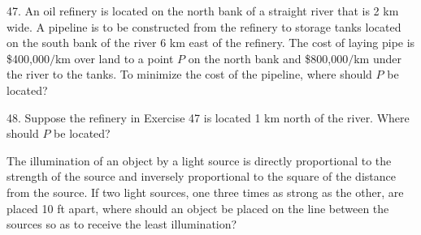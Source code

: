 \documentclass{sebase}
\begin{document}
\begin{multicols}{2}
\begin{ExerciseList}
%

\item[\hfill 47.] An oil refinery is located on the north bank of a straight
river that is 2 km wide. A pipeline is to be constructed from the refinery
to storage tanks located on the south bank of the river 6 km east of the
refinery. The cost of laying pipe is \$400,000$/$km over land to a point $P$
on the north bank and \$800,000$/$km under the river to the tanks. To
minimize the cost of the pipeline, where should $P$ be located?

%

%

\item[\hfill 48.] 
\GCALCX%
Suppose the refinery in Exercise 47 is located 1 km north of the river.
Where should $P$ be located?

%

\item[{\hfill {\protect\fbox{\hspace{-2pt}49.\hspace{-2pt}}}}] The
illumination of an object by a light source is directly proportional to the
strength of the source and inversely proportional to the square of the
distance from the source. If two light sources, one three times as strong as
the other, are placed 10 ft apart, where should an object be placed on the
line between the sources so as to receive the least illumination?

%


\end{ExerciseList}
\end{multicols}
\end{document}
